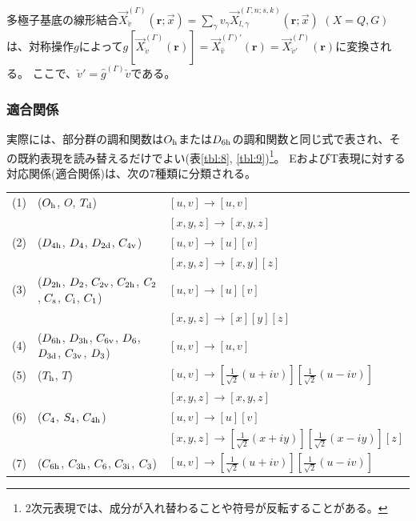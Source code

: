 \documentclass[11pt]{easymemo}
\begin{document}
多極子基底の線形結合$\vec{X}^{(\Gamma)}_{\check{v}}(\bm{r};\vec{x})=\sum_{\gamma}v_{\gamma}\vec{X}_{l,\gamma}^{(\Gamma,n;s,k)}(\bm{r};\vec{x})$ $(X=Q,G)$は、対称操作$g$によって$g[\vec{X}^{(\Gamma)}_{\check{v}}(\bm{r})]=\vec{X}_{\hat{v}}^{(\Gamma)'}(\bm{r})=\vec{X}^{(\Gamma)}_{\check{v}'}(\bm{r})$に変換される。
ここで、$\check{v}'=\hat{g}^{(\Gamma)}\check{v}$である。

\subsubsection{適合関係}

実際には、部分群の調和関数は$O_{\rm h}$または$D_{\rm 6h}$の調和関数と同じ式で表され、その既約表現を読み替えるだけでよい(表\ref{tbl:8}, \ref{tbl:9})\footnote{2次元表現では、成分が入れ替わることや符号が反転することがある。}。
EおよびT表現に対する対応関係(適合関係)は、次の7種類に分類される。
\begin{center}
\begin{tabular}{lll}
(1) &  ($O_{\rm h}$, $O$, $T_{\rm d}$) & $[u,v]\to[u,v]$ \\&& $[x,y,z]\to[x,y,z]$ \\
(2) &  ($D_{\rm 4h}$, $D_{\rm 4}$, $D_{\rm 2d}$, $C_{\rm 4v}$) & $[u,v]\to[u][v]$ \\&& $[x,y,z]\to[x,y][z]$ \\
(3) &  ($D_{\rm 2h}$, $D_{\rm 2}$, $C_{\rm 2v}$, $C_{\rm 2h}$, $C_{\rm 2}$, $C_{\rm s}$, $C_{\rm i}$, $C_{\rm 1}$) & $[u,v]\to[u][v]$ \\&& $[x,y,z]\to[x][y][z]$ \\
(4) &  ($D_{\rm 6h}$, $D_{\rm 3h}$, $C_{\rm 6v}$, $D_{\rm 6}$, $D_{\rm 3d}$, $C_{\rm 3v}$, $D_{\rm 3}$) & $[u,v]\to[u,v]$ \\
(5) &  ($T_{\rm h}$, $T$) & $[u,v]\to[\frac{1}{\sqrt{2}}(u+iv)][\frac{1}{\sqrt{2}}(u-iv)]$ \\&& $[x,y,z]\to[x,y,z]$ \\
(6) &  ($C_{\rm 4}$, $S_{\rm 4}$, $C_{\rm 4h}$) & $[u,v]\to[u][v]$ \\&& $[x,y,z]\to[\frac{1}{\sqrt{2}}(x+iy)][\frac{1}{\sqrt{2}}(x-iy)][z]$ \\
(7) & ($C_{\rm 6h}$, $C_{\rm 3h}$, $C_{\rm 6}$, $C_{\rm 3i}$, $C_{\rm 3}$) & $[u,v]\to[\frac{1}{\sqrt{2}}(u+iv)][\frac{1}{\sqrt{2}}(u-iv)]$
\end{tabular}
\end{center}
\end{document}
